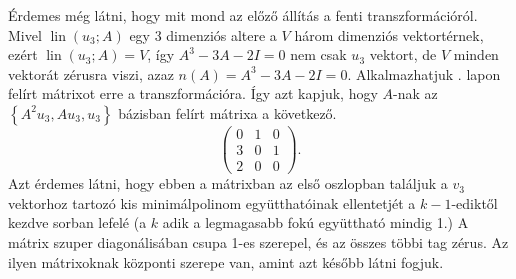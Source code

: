 \documentclass[a4paper, showtrims]{memoir}
\theoremstyle{plain}
\theoremstyle{remark}
\theoremstyle{definition}
\DeclareMathOperator{\lin}{lin}
\begin{document}
Érdemes még látni, hogy mit mond az előző állítás a fenti transzformációról.
Mivel $\lin\left( u_3;A \right)$ egy 3 dimenziós altere a $V$ három dimenziós vektortérnek,
ezért $\lin\left( u_3;A \right)=V$, így $A^{3}-3A-2I=0$ nem csak $u_3$ vektort, de $V$ minden vektorát zérusra viszi,
azaz $n\left( A \right)=A^3-3A-2I=0$.
Alkalmazhatjuk \aazt{\pageref{ar:elsomegjelenes}}. lapon felírt mátrixot erre a transzformációra.
Így azt kapjuk, hogy $A$-nak az $\left\{A^2u_3,Au_3,u_3\right\}$ bázisban felírt mátrixa a következő.
\[
    \begin{pmatrix}
        0&1&0\\
        3&0&1\\
        2&0&0
    \end{pmatrix}.
\]
Azt érdemes látni, hogy ebben a mátrixban az első oszlopban találjuk a $v_3$ vektorhoz tartozó kis minimálpolinom együtthatóinak ellentetjét
a $k-1$-ediktől kezdve sorban lefelé (a $k$ adik a legmagasabb fokú együttható mindig 1.)
A mátrix szuper diagonálisában csupa 1-es szerepel, és az összes többi tag zérus. 
Az ilyen mátrixoknak központi szerepe van, amint azt később látni fogjuk.
\end{document}
